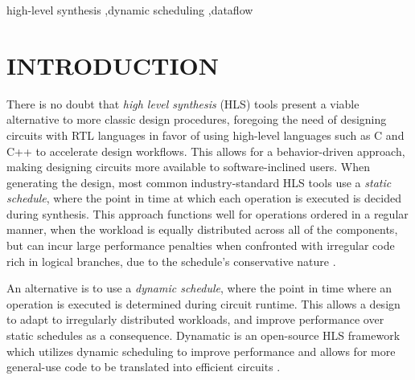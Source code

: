 \documentclass[final,5p,times,twocolumn]{elsarticle}
\begin{document}
\begin{spacing}{1.125}
\begin{frontmatter}


\begin{keyword}
high-level synthesis \sep dynamic scheduling \sep dataflow



\end{keyword}


\end{frontmatter}




\section{INTRODUCTION}
There is no doubt that \textit{high level synthesis} (HLS) tools present a viable alternative to more classic design procedures, foregoing the need of designing circuits with RTL languages in favor of using high-level languages such as C and C++ to accelerate design workflows. This allows for a behavior-driven approach, making designing circuits more available to software-inclined users. When generating the design, most common industry-standard HLS tools use a \textit{static schedule}, where the point in time at which each operation is executed is decided during synthesis. This approach functions well for operations ordered in a regular manner, when the workload is equally distributed across all of the components, but can incur large performance penalties when confronted with irregular code rich in logical branches, due to the schedule's conservative nature \cite{dataflow_circs}.

An alternative is to use a \textit{dynamic schedule}, where the point in time where an operation is executed is determined during circuit runtime. This allows a design to adapt to irregularly distributed workloads, and improve performance over static schedules as a consequence. Dynamatic is an open-source HLS framework which utilizes dynamic scheduling to improve performance and allows for more general-use code to be translated into efficient circuits \cite{dyn_tut}.


\end{spacing}
\end{document}
